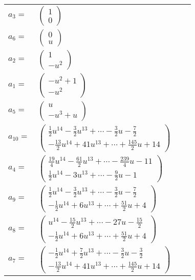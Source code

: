 \documentclass[1p]{elsarticle_modified}
\theoremstyle{definition}
\begin{document}
\begin{tabular}{m{7pt} m{180pt} m{7pt} m{180pt} }
\flushright $a_{3}=$&$\begin{pmatrix}1\\0\end{pmatrix}$ \\
\flushright $a_{6}=$&$\begin{pmatrix}0\\u\end{pmatrix}$ \\
\flushright $a_{2}=$&$\begin{pmatrix}1\\- u^2\end{pmatrix}$ \\
\flushright $a_{1}=$&$\begin{pmatrix}- u^2+1\\- u^2\end{pmatrix}$ \\
\flushright $a_{5}=$&$\begin{pmatrix}u\\- u^3+u\end{pmatrix}$ \\
\flushright $a_{10}=$&$\begin{pmatrix}\frac{1}{2} u^{14}-\frac{3}{2} u^{13}+\cdots-\frac{3}{2} u-\frac{7}{2}\\-\frac{13}{2} u^{14}+41 u^{13}+\cdots+\frac{145}{2} u+14\end{pmatrix}$ \\
\flushright $a_{4}=$&$\begin{pmatrix}\frac{19}{4} u^{14}-\frac{61}{2} u^{13}+\cdots-\frac{239}{4} u-11\\\frac{1}{2} u^{14}-3 u^{13}+\cdots-\frac{9}{2} u-1\end{pmatrix}$ \\
\flushright $a_{9}=$&$\begin{pmatrix}\frac{1}{2} u^{14}-\frac{3}{2} u^{13}+\cdots-\frac{3}{2} u-\frac{7}{2}\\-\frac{1}{2} u^{14}+6 u^{13}+\cdots+\frac{51}{2} u+4\end{pmatrix}$ \\
\flushright $a_{8}=$&$\begin{pmatrix}u^{14}-\frac{15}{2} u^{13}+\cdots-27 u-\frac{15}{2}\\-\frac{1}{2} u^{14}+6 u^{13}+\cdots+\frac{51}{2} u+4\end{pmatrix}$ \\
\flushright $a_{7}=$&$\begin{pmatrix}-\frac{1}{2} u^{14}+\frac{7}{2} u^{13}+\cdots-\frac{3}{2} u-\frac{3}{2}\\-\frac{13}{2} u^{14}+41 u^{13}+\cdots+\frac{145}{2} u+14\end{pmatrix}$ \\

\end{tabular}
\end{document}
